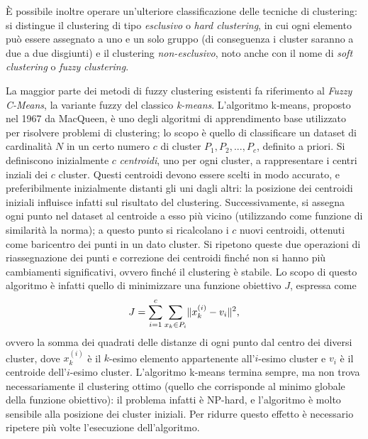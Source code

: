 \documentclass[oneside, openany]{book}
\DeclarePairedDelimiter{\norma}{\lVert}{\rVert}
\begin{document}
			\`E possibile inoltre operare un'ulteriore classificazione delle tecniche di clustering: si distingue il clustering di tipo \textit{esclusivo} o \textit{hard clustering}, in cui ogni elemento può essere assegnato a uno e un solo gruppo (di conseguenza i cluster saranno a due a due disgiunti) e il clustering \textit{non-esclusivo}, noto anche con il nome di \textit{soft clustering} o \textit{fuzzy clustering}.
			
			La maggior parte dei metodi di fuzzy clustering esistenti fa riferimento al \textit{Fuzzy C-Means}, la variante fuzzy del classico \textit{k-means}. L'algoritmo k-means, proposto nel 1967 da MacQueen, è uno degli algoritmi di apprendimento base utilizzato per risolvere problemi di clustering; lo scopo è quello di classificare un dataset di cardinalità $N$ in un certo numero $c$ di cluster $P_1,P_2,...,P_c$, definito a priori.
			Si definiscono inizialmente $c$ \textit{centroidi}, uno per ogni cluster, a rappresentare i centri inziali dei $c$ cluster. Questi centroidi devono essere scelti in modo accurato, e preferibilmente inizialmente distanti gli uni dagli altri: la posizione dei centroidi iniziali influisce infatti sul risultato del clustering. Successivamente, si assegna ogni punto nel dataset al centroide a esso più vicino (utilizzando come funzione di similarità la norma); a questo punto si ricalcolano i $c$ nuovi centroidi, ottenuti come baricentro dei punti in un dato cluster. Si ripetono queste due operazioni di riassegnazione dei punti e correzione dei centroidi finché non si hanno più cambiamenti significativi, ovvero finché il clustering è stabile. Lo scopo di questo algoritmo è infatti quello di minimizzare una funzione obiettivo $J$, espressa come
			\[
			J = \sum_{i=1}^{c}\sum_{x_k\in P_i}\norma{x_k^{(i)}-v_i}^2\text{,}
			\]
			ovvero la somma dei quadrati delle distanze di ogni punto dal centro dei diversi cluster, dove $x_k^{(i)}$ è il $k$-esimo elemento appartenente all'$i$-esimo cluster e $v_i$ è il centroide dell'$i$-esimo cluster. 
			L'algoritmo k-means termina sempre, ma non trova necessariamente il clustering ottimo (quello che corrisponde al minimo globale della funzione obiettivo): il problema infatti è NP-hard, e l'algoritmo è molto sensibile alla posizione dei cluster iniziali. Per ridurre questo effetto è necessario ripetere più volte l'esecuzione dell'algoritmo.\\
\end{document}
